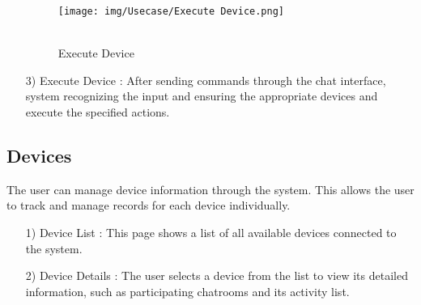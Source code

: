 \documentclass[conference]{IEEEtran}
\begin{document}
\begin{enumerate}
    \begin{figure}[h]
\hspace{1.5cm}
\centering
\begin{minipage}{0.4\columnwidth}
    \texttt{[image: img/Usecase/Execute Device.png]}
    \caption{\\ Execute Device}
\end{minipage}
\end{figure}
    \item [3)] Execute Device : After sending commands through the chat interface, system recognizing the input and ensuring the appropriate devices and execute the specified actions. \\
\end{enumerate}

\subsection{Devices}
The user can manage device information through the system. This allows the user to track and manage records for each device individually. \\

\begin{enumerate}
    \begin{figure}[h]
\hspace{1.5cm}
\centering
\begin{minipage}{0.4\columnwidth}
    \texttt{[image: img/Usecase/Devices List.png]}
    \caption{\\ Device List}
\end{minipage}
\end{figure}
    \item [1)] Device List : This page shows a list of all available devices connected to the system. \\
\end{enumerate}

\begin{enumerate}
    \begin{figure}[h]
\hspace{1.5cm}
\centering
\begin{minipage}{0.4\columnwidth}
    \texttt{[image: img/Usecase/Device Details.png]}
    \caption{\\ Device Details}
\end{minipage}
\end{figure}
    \item [2)] Device Details : The user selects a device from the list to view its detailed information, such as participating chatrooms and its activity list.  \\
\end{enumerate}
\end{document}

